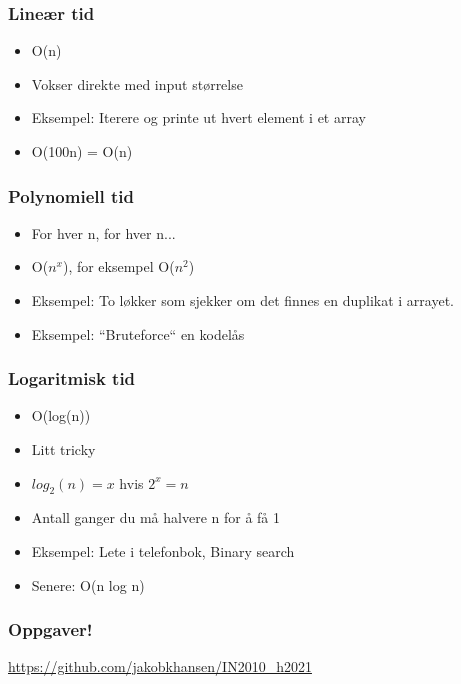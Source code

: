 \documentclass[norsk]{beamer}
\begin{document}
    \begin{frame}
        \frametitle{Lineær tid}

        \begin{itemize}
            \item O(n)
            \item Vokser direkte med input størrelse
            \item Eksempel: Iterere og printe ut hvert element i et array
            \item O(100n) = O(n)
        \end{itemize}

    \end{frame}

    \begin{frame}
        \frametitle{Polynomiell tid}

        \begin{itemize}
            \item For hver n, for hver n...
            \item O($n^x$), for eksempel O($n^2$)
            \item Eksempel: To løkker som sjekker om det finnes en duplikat i arrayet.
            \item Eksempel: ``Bruteforce`` en kodelås
        \end{itemize}
    \end{frame}

    \begin{frame}
        \frametitle{Logaritmisk tid}

        \begin{itemize}
            \item O(log(n))
            \item Litt tricky
            \item $log_2(n) = x$ hvis $2^x = n$
            \item Antall ganger du må halvere n for å få 1
            \item Eksempel: Lete i telefonbok, Binary search
            \item Senere: O(n log n)
        \end{itemize}
    \end{frame}

    \begin{frame}
        \frametitle{Oppgaver!}

        \begin{center}
            \url{https://github.com/jakobkhansen/IN2010_h2021}
        \end{center}
    \end{frame}
\end{document}
